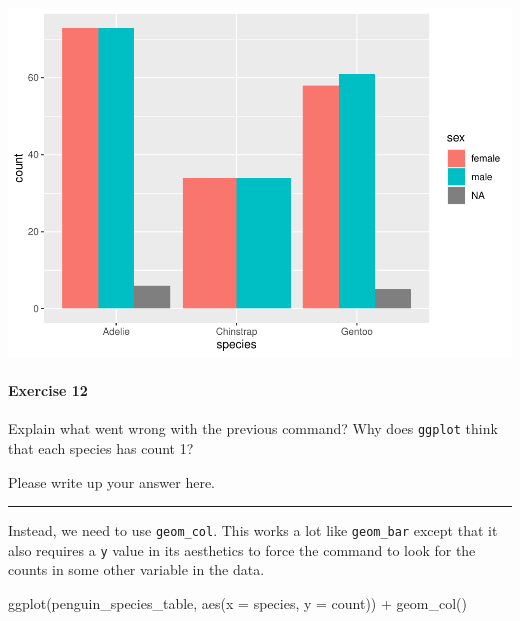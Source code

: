 \documentclass[
]{book}
\newenvironment{Shaded}{\begin{snugshade}}{\end{snugshade}}
\newcommand{\AttributeTok}[1]{\textcolor[rgb]{0.77,0.63,0.00}{#1}}
\newcommand{\FunctionTok}[1]{\textcolor[rgb]{0.00,0.00,0.00}{#1}}
\newcommand{\NormalTok}[1]{#1}
\newcommand{\SpecialCharTok}[1]{\textcolor[rgb]{0.00,0.00,0.00}{#1}}
\begin{document}
\includegraphics{intro_stats_files/figure-latex/unnamed-chunk-72-1.pdf}

\hypertarget{exercise-12}{%
\paragraph*{Exercise 12}\label{exercise-12}}

Explain what went wrong with the previous command? Why does \texttt{ggplot} think that each species has count 1?

Please write up your answer here.

\begin{center}\rule{0.5\linewidth}{0.5pt}\end{center}

Instead, we need to use \texttt{geom\_col}. This works a lot like \texttt{geom\_bar} except that it also requires a \texttt{y} value in its aesthetics to force the command to look for the counts in some other variable in the data.

\begin{Shaded}
\begin{Highlighting}[]
\FunctionTok{ggplot}\NormalTok{(penguin\_species\_table, }\FunctionTok{aes}\NormalTok{(}\AttributeTok{x =}\NormalTok{ species, }\AttributeTok{y =}\NormalTok{ count)) }\SpecialCharTok{+}
    \FunctionTok{geom\_col}\NormalTok{()}
\end{Highlighting}
\end{Shaded}
\end{document}

